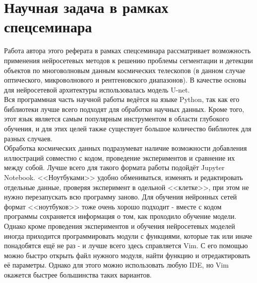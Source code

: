 \chapter{Научная задача в рамках спецсеминара}
\label{cha:ch_3}

Работа автора этого реферата в рамках спецсеминара рассматривает возможность применения нейросетевых методов к 
решению проблемы сегментации и детекции объектов по многоволновым данным космических телескопов 
(в данном случае оптического, микроволнового и рентгеновского диапазонов). В качестве основы для нейросетевой архитектуры использовалась модель U-net.\\

Вся программная часть научной работы ведётся на языке Python, так как его библиотеки лучше всего 
подходят для обработки научных данных. Кроме того, этот язык является самым популярным инструментом 
в области глубокого обучения, и для этих целей также существует большое количество библиотек для 
разных случаев.\\

Обработка космических данных подразумеват наличие возможности добавления иллюстраций совместно с 
кодом, проведение экспериментов и сравнение их между собой. Лучше всего для такого формата работы 
подойдёт Jupyter Notebook. <<Ноутбуками>> удобно обмениваться, изменять и редактировать отдельные 
данные, проверяя эксперимент в одельной <<клетке>>, при этом не нужно перезапускать всю программу 
заново. Для обучения нейронных сетей формат <<ноутбуков>> тоже очень хорошо подходит - вместе с 
кодом программы сохраняется информация о том, как проходило обучение модели. \\

Однако кроме проведения экспериментов и обучения нейросетевых моделей иногда приходится 
программировать модули с функциями, которые так или иначе понадобятся ещё не раз - и лучше всего 
здесь справляется Vim. С его помощью можно быстро открыть файл нужного модуля, найти функцию и 
отредактировать её параметры. Однако для этого можно использовать любую IDE, но Vim окажется 
быстрее большинства таких вариантов.\\

